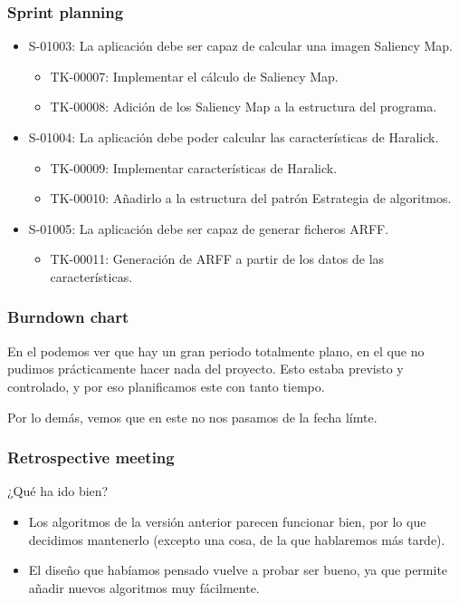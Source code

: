 \subsubsection*{Sprint planning}
\begin{itemize}
 \item S-01003: La aplicación debe ser capaz de calcular una imagen Saliency Map.
 \begin{itemize}
  \item TK-00007: Implementar el cálculo de Saliency Map.
  \item TK-00008: Adición de los Saliency Map a la estructura del programa.
 \end{itemize} 
 \item S-01004: La aplicación debe poder calcular las características de Haralick.
 \begin{itemize}
  \item TK-00009: Implementar características de Haralick.
  \item TK-00010: Añadirlo a la estructura del patrón Estrategia de algoritmos.
 \end{itemize}
 \item S-01005: La aplicación debe ser capaz de generar ficheros ARFF.
 \begin{itemize}
  \item TK-00011: Generación de ARFF a partir de los datos de las características.
 \end{itemize}
\end{itemize}

\subsubsection*{Burndown chart}
En el \burndownchart{}  podemos ver que hay un gran periodo totalmente plano, en el que no pudimos prácticamente hacer nada del proyecto. Esto estaba previsto y controlado, y por eso planificamos este \sprint{} con tanto tiempo.


Por lo demás, vemos que en este \sprint{} no nos pasamos de la fecha límte.

\subsubsection*{Retrospective meeting}
¿Qué ha ido bien?
\begin{itemize}
 \item Los algoritmos de la versión anterior parecen funcionar bien, por lo que decidimos mantenerlo (excepto una cosa, de la que hablaremos más tarde).
 \item El diseño que habíamos pensado vuelve a probar ser bueno, ya que permite añadir nuevos algoritmos muy fácilmente.
\end{itemize}

